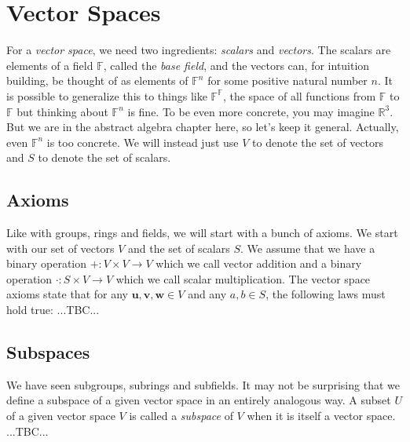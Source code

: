 \section{Vector Spaces}
For a \emph{vector space}, we need two ingredients: \emph{scalars} and \emph{vectors}. The scalars are elements of a field $\mathbb{F}$, called the \emph{base field}, and the vectors can, for intuition building, be thought of as elements of $\mathbb{F}^n$ for some positive natural number $n$. It is possible to generalize this to things like $\mathbb{F}^\mathbb{F}$, the space of all functions from $\mathbb{F}$ to $\mathbb{F}$ but thinking about $\mathbb{F}^n$ is fine. To be even more concrete, you may imagine $\mathbb{R}^3$. But we are in the abstract algebra chapter here, so let's keep it general. Actually, even $\mathbb{F}^n$ is too concrete. We will instead just use $V$ to denote the set of vectors and $S$ to denote the set of scalars. 


\subsection{Axioms} Like with groups, rings and fields, we will start with a bunch of axioms. We start with our set of vectors $V$ and the set of scalars $S$. We assume that we have a binary operation $+: V \times V \rightarrow V$ which we call vector addition and a binary operation $\cdot : S \times V \rightarrow V$ which we call scalar multiplication. The vector space axioms state that for any $\mathbf{u,v,w} \in V$ and any $a,b \in S$, the following laws must hold true: ...TBC...



\subsection{Subspaces} 
We have seen subgroups, subrings and subfields. It may not be surprising that we define a subspace of a given vector space in an entirely analogous way. A subset $U$ of a given vector space $V$ is called a \emph{subspace} of $V$ when it is itself a vector space. ...TBC...

